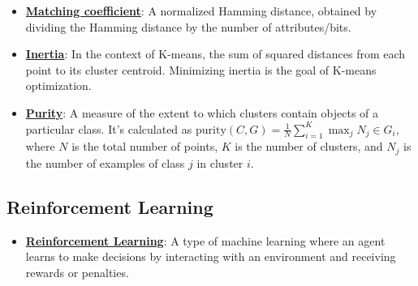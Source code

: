 \documentclass{article}%
\begin{document}
\begin{itemize}[leftmargin=*]
\item \href{https://purdue.brightspace.com/d2l/common/assets/pdfjs-d2l-dist/1.0.14-legacy/web/viewer.html?file=\%2Fcontent\%2Fenforced\%2F1095467-wl.202510.CS.24300.001\%2F12L2-distance-clusters.pdf\%3Fou\%3D1095467\&lang=en-us\&container=d2l-fileviewer-rendered-pdf\&fullscreen=d2l-fileviewer-rendered-pdf-dialog\&height=667#page=19}{\textbf{Matching coefficient}}: A normalized Hamming distance, obtained by dividing the Hamming distance by the number of attributes/bits.%
\item \href{https://purdue.brightspace.com/d2l/common/assets/pdfjs-d2l-dist/1.0.14-legacy/web/viewer.html?file=\%2Fcontent\%2Fenforced\%2F1095467-wl.202510.CS.24300.001\%2F12L2-distance-clusters.pdf\%3Fou\%3D1095467\&lang=en-us\&container=d2l-fileviewer-rendered-pdf\&fullscreen=d2l-fileviewer-rendered-pdf-dialog\&height=667#page=33}{\textbf{Inertia}}: In the context of K-means, the sum of squared distances from each point to its cluster centroid. Minimizing inertia is the goal of K-means optimization.%
\item \href{https://purdue.brightspace.com/d2l/common/assets/pdfjs-d2l-dist/1.0.14-legacy/web/viewer.html?file=\%2Fcontent\%2Fenforced\%2F1095467-wl.202510.CS.24300.001\%2F12L2-distance-clusters.pdf\%3Fou\%3D1095467\&lang=en-us\&container=d2l-fileviewer-rendered-pdf\&fullscreen=d2l-fileviewer-rendered-pdf-dialog\&height=667#page=44}{\textbf{Purity}}: A measure of the extent to which clusters contain objects of a particular class. It's calculated as $\text{purity}(C, G) = \frac{1}{N} \sum_{i=1}^{K} \max_j N_j \in G_i$, where $N$ is the total number of points, $K$ is the number of clusters, and $N_j$ is the number of examples of class $j$ in cluster $i$.%
\end{itemize}

%
\subsection{Reinforcement Learning}%
\label{subsec:ReinforcementLearning}%
\begin{itemize}[leftmargin=*]%
\item \href{https://purdue.brightspace.com/d2l/common/assets/pdfjs-d2l-dist/1.0.14-legacy/web/viewer.html?file=\%2Fcontent\%2Fenforced\%2F1095467-wl.202510.CS.24300.001\%2F02L2-Intro.pdf\%3Fou\%3D1095467\&lang=en-us\&container=d2l-fileviewer-rendered-pdf\&fullscreen=d2l-fileviewer-rendered-pdf-dialog\&height=667#page=46}{\textbf{Reinforcement Learning}}: A type of machine learning where an agent learns to make decisions by interacting with an environment and receiving rewards or penalties.%
\end{itemize}
\end{document}
